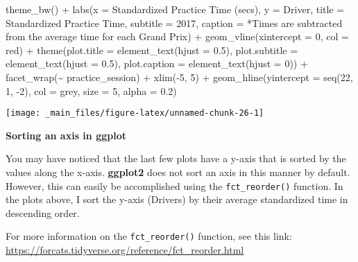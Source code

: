 \documentclass[
]{book}
\newenvironment{Shaded}{\begin{snugshade}}{\end{snugshade}}
\newcommand{\AttributeTok}[1]{\textcolor[rgb]{0.77,0.63,0.00}{#1}}
\newcommand{\DecValTok}[1]{\textcolor[rgb]{0.00,0.00,0.81}{#1}}
\newcommand{\FloatTok}[1]{\textcolor[rgb]{0.00,0.00,0.81}{#1}}
\newcommand{\FunctionTok}[1]{\textcolor[rgb]{0.00,0.00,0.00}{#1}}
\newcommand{\NormalTok}[1]{#1}
\newcommand{\SpecialCharTok}[1]{\textcolor[rgb]{0.00,0.00,0.00}{#1}}
\newcommand{\StringTok}[1]{\textcolor[rgb]{0.31,0.60,0.02}{#1}}
\begin{document}
\begin{Shaded}
\begin{Highlighting}[]
   \FunctionTok{theme\_bw}\NormalTok{() }\SpecialCharTok{+}
   \FunctionTok{labs}\NormalTok{(}\AttributeTok{x =} \StringTok{\textquotesingle{}Standardized Practice Time (secs)\textquotesingle{}}\NormalTok{,}
        \AttributeTok{y =} \StringTok{\textquotesingle{}Driver\textquotesingle{}}\NormalTok{,}
        \AttributeTok{title =} \StringTok{\textquotesingle{}Standardized Practice Time\textquotesingle{}}\NormalTok{,}
        \AttributeTok{subtitle =} \StringTok{\textquotesingle{}2017\textquotesingle{}}\NormalTok{,}
        \AttributeTok{caption =} \StringTok{\textquotesingle{}*Times are subtracted from the average time for each Grand Prix\textquotesingle{}}\NormalTok{) }\SpecialCharTok{+}
   \FunctionTok{geom\_vline}\NormalTok{(}\AttributeTok{xintercept =} \DecValTok{0}\NormalTok{, }\AttributeTok{col =} \StringTok{\textquotesingle{}red\textquotesingle{}}\NormalTok{) }\SpecialCharTok{+}
   \FunctionTok{theme}\NormalTok{(}\AttributeTok{plot.title =} \FunctionTok{element\_text}\NormalTok{(}\AttributeTok{hjust =} \FloatTok{0.5}\NormalTok{),}
         \AttributeTok{plot.subtitle =} \FunctionTok{element\_text}\NormalTok{(}\AttributeTok{hjust =} \FloatTok{0.5}\NormalTok{),}
         \AttributeTok{plot.caption =} \FunctionTok{element\_text}\NormalTok{(}\AttributeTok{hjust =} \DecValTok{0}\NormalTok{)) }\SpecialCharTok{+}
  \FunctionTok{facet\_wrap}\NormalTok{(}\SpecialCharTok{\textasciitilde{}}\NormalTok{ practice\_session) }\SpecialCharTok{+}
  \FunctionTok{xlim}\NormalTok{(}\SpecialCharTok{{-}}\DecValTok{5}\NormalTok{, }\DecValTok{5}\NormalTok{) }\SpecialCharTok{+}
  \FunctionTok{geom\_hline}\NormalTok{(}\AttributeTok{yintercept =} \FunctionTok{seq}\NormalTok{(}\DecValTok{22}\NormalTok{, }\DecValTok{1}\NormalTok{, }\SpecialCharTok{{-}}\DecValTok{2}\NormalTok{), }\AttributeTok{col =} \StringTok{\textquotesingle{}grey\textquotesingle{}}\NormalTok{, }\AttributeTok{size =} \DecValTok{5}\NormalTok{, }\AttributeTok{alpha =}  \FloatTok{0.2}\NormalTok{)}
\end{Highlighting}
\end{Shaded}

\begin{center}\texttt{[image: \_main\_files/figure-latex/unnamed-chunk-26-1]} \end{center}

\begin{blackbox}

\begin{center}
\textbf{Sorting an axis in ggplot}

\end{center}

You may have noticed that the last few plots have a y-axis that is sorted by the values along the x-axis. \textbf{ggplot2} does not sort an axis in this manner by default. However, this can easily be accomplished using the \texttt{fct\_reorder()} function. In the plots above, I sort the y-axis (Drivers) by their average standardized time in descending order.

For more information on the \texttt{fct\_reorder()} function, see this link: \url{https://forcats.tidyverse.org/reference/fct_reorder.html}

\end{blackbox}
\end{document}
